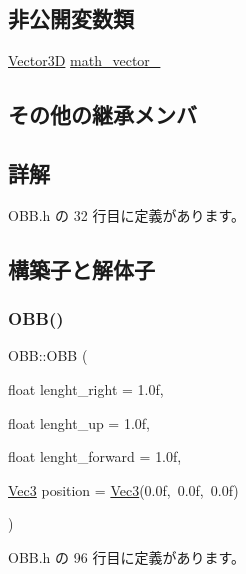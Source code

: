 \subsection*{非公開変数類}
\begin{DoxyCompactItemize}
\item 
\mbox{\hyperlink{class_vector3_d}{Vector3D}} \mbox{\hyperlink{class_o_b_b_ae2bb48bafa38fdf30f0e383da193152c}{math\+\_\+vector\+\_\+}}
\end{DoxyCompactItemize}
\subsection*{その他の継承メンバ}


\subsection{詳解}


 O\+B\+B.\+h の 32 行目に定義があります。



\subsection{構築子と解体子}
\mbox{\label{class_o_b_b_a368e87fc4c7cbc04569229010c88f8cc}} 
\subsubsection{\texorpdfstring{O\+B\+B()}{OBB()}}
{\footnotesize\ttfamily O\+B\+B\+::\+O\+BB (\begin{DoxyParamCaption}\item[{float}]{lenght\+\_\+right = {\ttfamily 1.0f},  }\item[{float}]{lenght\+\_\+up = {\ttfamily 1.0f},  }\item[{float}]{lenght\+\_\+forward = {\ttfamily 1.0f},  }\item[{\mbox{\hyperlink{_vector3_d_8h_ab16f59e4393f29a01ec8b9bbbabbe65d}{Vec3}}}]{position = {\ttfamily \mbox{\hyperlink{_vector3_d_8h_ab16f59e4393f29a01ec8b9bbbabbe65d}{Vec3}}(0.0f,~0.0f,~0.0f)} }\end{DoxyParamCaption})\hspace{0.3cm}{\ttfamily [inline]}}



 O\+B\+B.\+h の 96 行目に定義があります。

